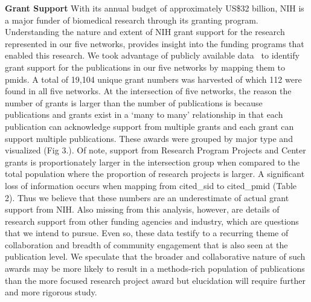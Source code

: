 \documentclass[10pt,letterpaper]{article}
\begin{document}
\textbf{Grant Support} With its annual budget of approximately US\$32 billion, NIH is a major funder of biomedical research through its granting program. Understanding the nature and extent of NIH grant support for the research represented in our five networks, provides insight into the funding programs that enabled this research. We took advantage of publicly available data~\cite{bibNIHExPORTER} to identify grant support for the publications in our five networks by mapping them to pmids. A total of 19,104 unique grant numbers was harvested of which 112 were found in all five networks. At the intersection of five networks, the reason the number of grants is larger than the number of publications is because publications and grants exist in a `many to many' relationship in that each publication can acknowledge support from multiple grants and each grant can support multiple publications. These awards were grouped by major type  and visualized (Fig 3.). Of note, support from Research Program Projects and Center grants is proportionately larger in the intersection group when compared to the total population where the proportion of research projects is larger. A significant loss of information occurs when mapping from cited\_sid to cited\_pmid (Table 2). Thus we believe that these numbers are an underestimate of actual grant support from NIH. Also missing from this analysis, however, are details of research support from other funding agencies and industry, which are questions that we intend to pursue. Even so, these data testify to a recurring theme of collaboration and breadth of community engagement that is also seen at the publication level. We speculate that the broader and collaborative nature of such awards may be more likely to result in a methods-rich population of publications than the more focused research project award but elucidation will require further and more rigorous study. 
\end{document}

